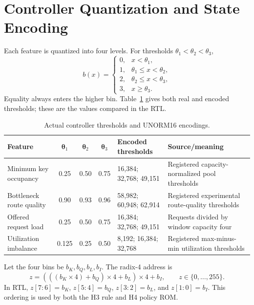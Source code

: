 \section{Controller Quantization and State Encoding}

Each feature is quantized into four levels. For thresholds
$\theta_1<\theta_2<\theta_3$,
\begin{equation}
b(x)=\begin{cases}
0,&x<\theta_1,\\
1,&\theta_1\le x<\theta_2,\\
2,&\theta_2\le x<\theta_3,\\
3,&x\ge\theta_3.
\end{cases}
\label{eq:four-bin}
\end{equation}
Equality always enters the higher bin. Table~\ref{tab:actual-thresholds} gives both
real and encoded thresholds; these are the values compared in the RTL.

\begin{table}[H]
\centering
\scriptsize
\caption{Actual controller thresholds and UNORM16 encodings.}
\label{tab:actual-thresholds}
\begin{tabularx}{\textwidth}{@{}p{2.7cm} c c c p{3.0cm} X@{}}
\toprule
\textbf{Feature} & $\boldsymbol\theta_1$ & $\boldsymbol\theta_2$ &
$\boldsymbol\theta_3$ & \textbf{Encoded thresholds} &
\textbf{Source/meaning}\\
\midrule
Minimum key occupancy & 0.25 & 0.50 & 0.75 & 16,384; 32,768; 49,151 &
Registered capacity-normalized pool thresholds\\
Bottleneck route quality & 0.90 & 0.93 & 0.96 & 58,982; 60,948; 62,914 &
Registered experimental route-quality thresholds\\
Offered request load & 0.25 & 0.50 & 0.75 & 16,384; 32,768; 49,151 &
Requests divided by window capacity four\\
Utilization imbalance & 0.125 & 0.25 & 0.50 & 8,192; 16,384; 32,768 &
Registered max-minus-min utilization thresholds\\
\bottomrule
\end{tabularx}
\end{table}

Let the four bins be $b_K,b_Q,b_L,b_I$. The radix-4 address is
\begin{equation}
z=(((b_K\times4)+b_Q)\times4+b_L)\times4+b_I,
\qquad z\in\{0,\ldots,255\}.
\label{eq:state-address}
\end{equation}
In RTL, $z[7{:}6]=b_K$, $z[5{:}4]=b_Q$, $z[3{:}2]=b_L$, and
$z[1{:}0]=b_I$. This ordering is used by both the H3 rule and H4 policy ROM.

